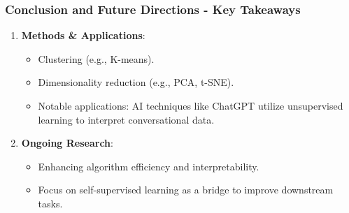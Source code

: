 \documentclass[aspectratio=169]{beamer}
\begin{document}
\begin{frame}[fragile]
  \frametitle{Conclusion and Future Directions - Key Takeaways}
  
  \begin{enumerate}
    \item \textbf{Methods \& Applications}:
    \begin{itemize}
      \item Clustering (e.g., K-means).
      \item Dimensionality reduction (e.g., PCA, t-SNE).
      \item Notable applications: AI techniques like ChatGPT utilize unsupervised learning to interpret conversational data.
    \end{itemize}
    
    \item \textbf{Ongoing Research}:
    \begin{itemize}
      \item Enhancing algorithm efficiency and interpretability.
      \item Focus on self-supervised learning as a bridge to improve downstream tasks.
    \end{itemize}
  \end{enumerate}

\end{frame}
\end{document}
